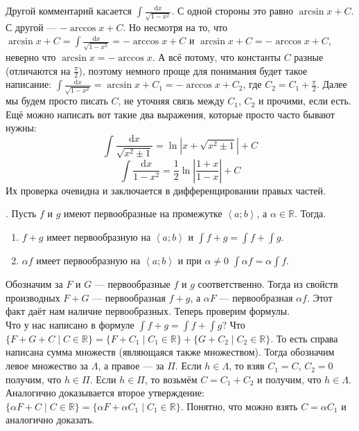 \documentclass{article}
\newcommand*{\ab}[1][a;b]{{\left\langle #1\right\rangle}}
\begin{document}
\begin{itemize}
\begin{Comment}
           Другой комментарий касается $\int\frac{\mathrm dx}{\sqrt{1-x^2}}$. С одной стороны это равно $\arcsin x+C$. С другой --- $-\arccos x+C$. Но несмотря на то, что $\arcsin x+C=\int\frac{\mathrm dx}{\sqrt{1-x^2}}=-\arccos x+C$ и $\arcsin x+C=-\arccos x+C$, неверно что $\arcsin x=-\arccos x$. А всё потому, что константы $C$ разные (отличаются на $\frac\pi2$), поэтому немного проще для понимания будет такое написание: $\int\frac{\mathrm dx}{\sqrt{1-x^2}}=\arcsin x+C_1=-\arccos x+C_2$, где $C_2=C_1+\frac\pi2$. Далее мы будем просто писать $C$, не уточняя связь между $C_1$, $C_2$ и прочими, если есть.\\
           Ещё можно написать вот такие два выражения, которые просто часто бывают нужны:
           $$\int\frac{\mathrm dx}{\sqrt{x^2\pm1}}=\ln|x+\sqrt{x^2\pm1}|+C$$
           $$\int\frac{\mathrm dx}{1-x^2}=\frac12\ln\left|\frac{1+x}{1-x}\right|+C$$
           Их проверка очевидна и заключается в дифференцировании правых частей.
        \end{Comment}
        \thm {}. Пусть $f$ и $g$ имеют первообразные на промежутке $\ab$, а $\alpha\in\mathbb R$. Тогда.
        \begin{enumerate}
            \item $f+g$ имеет первообразную на $\ab$ и $\int f+g=\int f+\int g$.
            \item $\alpha f$ имеет первообразную на $\ab$ и при $\alpha\neq0$ $\int\alpha f=\alpha\int f$.
        \end{enumerate}
        \begin{Proof}
            Обозначим за $F$ и $G$ --- первообразные $f$ и $g$ соответственно. Тогда из свойств производных $F+G$ --- первообразная $f+g$, а $\alpha F$ --- первообразная $\alpha f$. Этот факт даёт нам наличие первообразных. Теперь проверим формулы.\\
            Что у нас написано в формуле $\int f+g=\int f+\int g$? Что $\{F+G+C\mid C\in\mathbb R\}=\{F+C_1\mid C_1\in\mathbb R\}+\{G+C_2\mid C_2\in\mathbb R\}$. То есть справа написана сумма множеств (являющаяся также множеством). Тогда обозначим левое множество за $\Lambda$, а правое --- за $\Pi$. Если $h\in\Lambda$, то взяв $C_1=C$, $C_2=0$ получим, что $h\in\Pi$. Если $h\in\Pi$, то возьмём $C=C_1+C_2$ и получим, что $h\in\Lambda$.\\
            Аналогично доказывается второе утверждение: $\{\alpha F+C\mid C\in\mathbb R\}=\{\alpha F+\alpha C_1\mid C_1\in\mathbb R\}$. Понятно, что можно взять $C=\alpha C_1$ и аналогично доказать.

\end{Proof}
\end{itemize}
\end{document}
